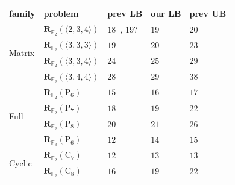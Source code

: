 \documentclass[11pt]{article}
\theoremstyle{definition}
\newcommand{\F}{\mathbb{F}}
\newcommand{\Rk}[2]{\mathbf{R}_{#1}(#2)}
\newcommand{\Cyct}[1]{\mathrm{C}_{#1}}
\newcommand{\Fullt}[1]{\mathrm{P}_{#1}}
\newcommand{\mmt}[3]{\langle #1,#2,#3\rangle}
\begin{document}
\begin{table}[!ht]
  \centering
  \small
  \setlength{\tabcolsep}{10pt}
  \begin{tabular}{lllll}
    \toprule
    family & problem                    & prev LB                                                                       & our LB & prev UB                                                      \\
    \midrule
    \multirow{4}{*}{Matrix}
    & $\Rk{\F_2}{\mmt{2}{3}{4}}$ & $18$~\cite{blaser1999lower}, $19$?~\cite{hopcroft1971minimizing}              & $19$   & $20$~\cite{hopcroft1971minimizing}                           \\
    & $\Rk{\F_2}{\mmt{3}{3}{3}}$ & $19$~\cite{blaser2003complexity}                                              & $20$   & $23$~\cite{laderman1976noncommutative}                       \\
    & $\Rk{\F_2}{\mmt{3}{3}{4}}$ & $24$~\cite{blaser2003complexity}                                              & $25$   & $29$~\cite{smirnov2013bilinear}                              \\
    & $\Rk{\F_2}{\mmt{3}{4}{4}}$ & $28$~\cite{blaser1999lower}                                                   & $29$   & $38$~\cite{smirnov2013bilinear}                              \\
    \midrule
    \multirow{4}{*}{Full}
    & $\Rk{\F_2}{\Fullt{6}}$     & $15$~\cite{lempel1983complexity,chudnovsky1988algebraic,grassl2007codetables} & $16$   & $17$~\cite{montgomery2005five}                               \\
    & $\Rk{\F_2}{\Fullt{7}}$     & $18$~\cite{lempel1983complexity,chudnovsky1988algebraic,grassl2007codetables} & $19$   & $22$~\cite{montgomery2005five}                               \\
    & $\Rk{\F_2}{\Fullt{8}}$     & $20$~\cite{lempel1983complexity,chudnovsky1988algebraic,grassl2007codetables} & $21$   & $26$~\cite{winograd1977some,fan2007comments}                 \\
    & $\Rk{\F_3}{\Fullt{6}}$     & $12$~\cite{lempel1983complexity,chudnovsky1988algebraic,griesmer1960bound}    & $14$   & $15$~\cite{winograd1977some}                                 \\
    \midrule
    \multirow{4}{*}{Cyclic}
    & $\Rk{\F_2}{\Cyct{7}}$      & $12$~\cite{degroote1983characterization,blaser2005complete}                   & $13$   & $13$~\cite{wagh1983structured}                               \\
    & $\Rk{\F_2}{\Cyct{8}}$      & $16$~\cite{averbuch1991classification,blaser2005complete}                     & $19$   & $22$~\cite{morgera1990multiplicative,cenk2011multiplication} \\

\end{tabular}
\end{table}
\end{document}
